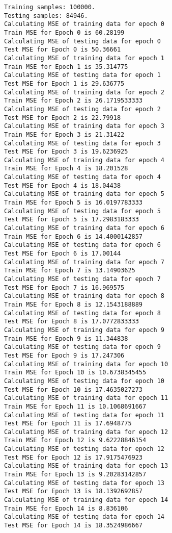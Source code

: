 \documentclass{article}
\begin{document}
    \begin{Verbatim}[commandchars=\\\{\}]
Training samples: 100000.
Testing samples: 84946.
Calculating MSE of training data for epoch 0
Train MSE for Epoch 0 is 60.28199
Calculating MSE of testing data for epoch 0
Test MSE for Epoch 0 is 50.36661
Calculating MSE of training data for epoch 1
Train MSE for Epoch 1 is 35.314775
Calculating MSE of testing data for epoch 1
Test MSE for Epoch 1 is 29.636775
Calculating MSE of training data for epoch 2
Train MSE for Epoch 2 is 26.1719533333
Calculating MSE of testing data for epoch 2
Test MSE for Epoch 2 is 22.79918
Calculating MSE of training data for epoch 3
Train MSE for Epoch 3 is 21.31422
Calculating MSE of testing data for epoch 3
Test MSE for Epoch 3 is 19.6236925
Calculating MSE of training data for epoch 4
Train MSE for Epoch 4 is 18.201528
Calculating MSE of testing data for epoch 4
Test MSE for Epoch 4 is 18.04438
Calculating MSE of training data for epoch 5
Train MSE for Epoch 5 is 16.0197783333
Calculating MSE of testing data for epoch 5
Test MSE for Epoch 5 is 17.2983183333
Calculating MSE of training data for epoch 6
Train MSE for Epoch 6 is 14.4000142857
Calculating MSE of testing data for epoch 6
Test MSE for Epoch 6 is 17.00144
Calculating MSE of training data for epoch 7
Train MSE for Epoch 7 is 13.14903625
Calculating MSE of testing data for epoch 7
Test MSE for Epoch 7 is 16.969575
Calculating MSE of training data for epoch 8
Train MSE for Epoch 8 is 12.1543188889
Calculating MSE of testing data for epoch 8
Test MSE for Epoch 8 is 17.0772833333
Calculating MSE of training data for epoch 9
Train MSE for Epoch 9 is 11.344838
Calculating MSE of testing data for epoch 9
Test MSE for Epoch 9 is 17.247306
Calculating MSE of training data for epoch 10
Train MSE for Epoch 10 is 10.6738345455
Calculating MSE of testing data for epoch 10
Test MSE for Epoch 10 is 17.4635027273
Calculating MSE of training data for epoch 11
Train MSE for Epoch 11 is 10.1068691667
Calculating MSE of testing data for epoch 11
Test MSE for Epoch 11 is 17.6948775
Calculating MSE of training data for epoch 12
Train MSE for Epoch 12 is 9.62228846154
Calculating MSE of testing data for epoch 12
Test MSE for Epoch 12 is 17.9175476923
Calculating MSE of training data for epoch 13
Train MSE for Epoch 13 is 9.20283142857
Calculating MSE of testing data for epoch 13
Test MSE for Epoch 13 is 18.1392692857
Calculating MSE of training data for epoch 14
Train MSE for Epoch 14 is 8.836106
Calculating MSE of testing data for epoch 14
Test MSE for Epoch 14 is 18.3524986667

\end{Verbatim}
\end{document}
